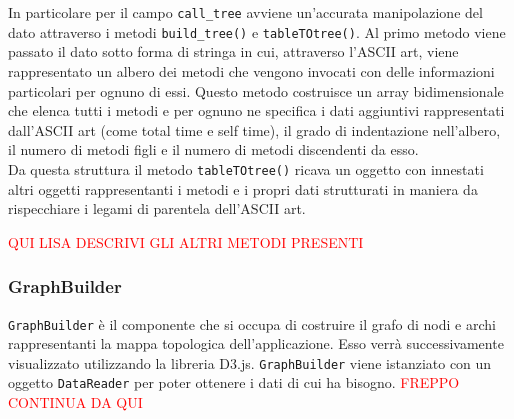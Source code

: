 	In particolare per il campo \texttt{call\_tree} avviene un'accurata manipolazione del dato attraverso i metodi \texttt{build\_tree()} e \texttt{tableTOtree()}. Al primo metodo viene  passato il dato sotto forma di stringa in cui, attraverso l'ASCII art, viene rappresentato un albero dei metodi che vengono invocati con delle informazioni particolari per ognuno di essi. Questo metodo costruisce un array bidimensionale che elenca tutti i metodi e per ognuno ne specifica i dati aggiuntivi rappresentati dall'ASCII art (come total time e self time), il grado di indentazione nell'albero, il numero di metodi figli e il numero di metodi discendenti da esso. \\ Da questa struttura il metodo \texttt{tableTOtree()} ricava un oggetto con innestati altri oggetti rappresentanti i metodi e i propri dati strutturati in maniera da rispecchiare i legami di parentela dell'ASCII art.


	\textcolor{red}{QUI LISA DESCRIVI GLI ALTRI METODI PRESENTI}

\subsubsection{GraphBuilder}
\label{sec:GraphBuilder}
	\texttt{GraphBuilder} è il componente che si occupa di costruire il grafo di nodi e archi rappresentanti la mappa topologica dell'applicazione. Esso verrà successivamente visualizzato utilizzando la libreria D3.js. \texttt{GraphBuilder} viene istanziato con un oggetto \texttt{DataReader} per poter ottenere i dati di cui ha bisogno. \textcolor{red}{FREPPO CONTINUA DA QUI}
	
